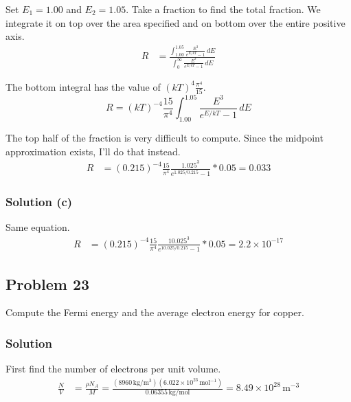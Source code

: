 \documentclass[12pt]{article}
\newcommand{\e}[1]{e^{#1}}
\newcommand{\E}[1]{\times 10^{#1}}
\begin{document}
            Set $E_1 = 1.00$ and $E_2 = 1.05$.
            Take a fraction to find the total fraction.
            We integrate it on top over the area specified and on bottom over the entire positive axis.
            \begin{align}
                R   &=  \frac{\int_{1.00}^{1.05}\frac{E^3}{\e{E/kT} - 1}\,dE}{\int_{0}^{\infty}\frac{E^3}{\e{E/kT} - 1}\,dE}
            \end{align}

            The bottom integral has the value of $(kT)^4\frac{\pi^4}{15}$.
            \begin{equation}
                R = (kT)^{-4} \frac{15}{\pi^4} \int_{1.00}^{1.05}\frac{E^3}{\e{E/kT} - 1}\,dE
            \end{equation}

            The top half of the fraction is very difficult to compute. 
            Since the midpoint approximation exists, I'll do that instead.
            \begin{align}
                R   &=  (0.215)^{-4} \frac{15}{\pi^4} \frac{1.025^3}{\e{1.025/0.215} - 1} * 0.05
                    =   \boxed{0.033}
            \end{align}

        \subsubsection{Solution (c)}
            Same equation.
            \begin{align}
                R   &=  (0.215)^{-4} \frac{15}{\pi^4} \frac{10.025^3}{\e{10.025/0.215} - 1} * 0.05
                    =   \boxed{2.2\E{-17}}
            \end{align}
        
    \pagebreak
    \subsection{Problem 23}
        Compute the Fermi energy and the average electron energy for copper.

        \subsubsection{Solution}
            First find the number of electrons per unit volume.
            \begin{align}
                \frac{N}{V} &=  \frac{\rho N_A}{M}
                    =   \frac{(8960\,\unit{\kilo\gram/\meter^3})(6.022\E{23}\,\unit{\mole^{-1}})}{0.06355\,\unit{\kilo\gram/\mole}}
                    =   8.49\E{28}\,\unit{\meter^{-3}}
            \end{align}
\end{document}

